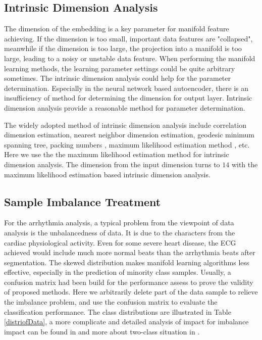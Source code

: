 \documentclass[journal]{IEEEtran}
\begin{document}
%
%
\subsection{Intrinsic Dimension Analysis}
The dimension of the embedding is a key parameter for manifold feature achieving.  
If the dimension is too small, important data features are "collapsed", meanwhile if the dimension is too large, the projection into a manifold is too large, leading to a noisy or unstable data feature.
When performing the manifold learning methods, the learning parameter settings could be quite arbitrary sometimes.
The intrinsic dimension analysis could help for the parameter determination.
Especially in the neural network based autoencoder, there is an insufficiency of method for determining the dimension for output layer.
Intrinsic dimension analysis provide a reasonable method for parameter determination.

The widely adopted method of intrinsic dimension analysis include correlation dimension estimation, nearest neighbor dimension estimation\cite{costa2005estimating}, geodesic minimum spanning tree\cite{costa2004geodesic}, packing numbers \cite{kegl2003intrinsic}, maximum likelihood estimation method \cite{levina2005maximum}, etc.
Here we use the the maximum likelihood estimation method for intrinsic dimension analysis.
The dimension from the input dimension turns to $14$ with the maximum likelihood estimation based intrinsic dimension analysis.



%
%
\subsection{Sample Imbalance Treatment}
For the arrhythmia analysis, a typical problem from the viewpoint of data analysis is the unbalancedness of data.
It is due to the characters from the cardiac physiological activity.
Even for some severe heart disease, the ECG achieved would include much more normal beats than the arrhythmia beats after segmentation.
The skewed distribution makes manifold learning algorithms less effective, especially in the prediction of minority class samples.
Usually, a confusion matrix had been build for the performance assess to prove the validity of proposed methods.
Here we arbitrarily delete part of the data sample to relieve the imbalance problem, and use the confusion matrix to evaluate the classification performance. 
The class distributions are illustrated in Table \ref{distriofData}, a more complicate and detailed analysis of impact for imbalance impact can be found in \cite{wang2012multiclass} and more about two-class situation in \cite{he2009learning}.
\end{document}
